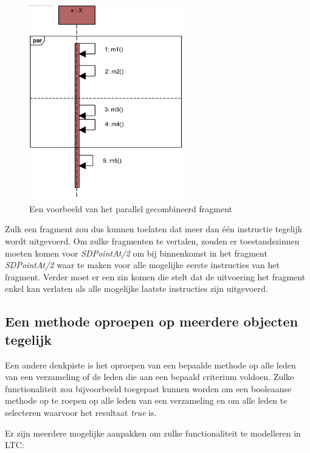 \begin{figure}
	\centering
	\includegraphics[width=0.6\textwidth]{chap-declaratieve-seq/seq-par.png}
	\caption{Een voorbeeld van het parallel gecombineerd fragment}
	\label{fig:seq-par}
\end{figure}

Zulk een fragment zou dus kunnen toelaten dat meer dan \'e\'en instructie tegelijk wordt uitgevoerd. Om zulke fragmenten te vertalen, zouden er toestandszinnen moeten komen voor \textit{SDPointAt/2} om bij binnenkomst in het fragment \textit{SDPointAt/2} waar te maken voor alle mogelijke eerste instructies van het fragment. Verder moet er een zin komen die stelt dat de uitvoering het fragment enkel kan verlaten als alle mogelijke laatste instructies zijn uitgevoerd.

\subsection{Een methode oproepen op meerdere objecten tegelijk}

Een andere denkpiste is het oproepen van een bepaalde methode op alle leden van een verzameling of de leden die aan een bepaald criterium voldoen. Zulke functionaliteit zou bijvoorbeeld toegepast kunnen worden om een booleaanse methode op te roepen op alle leden van een verzameling en om alle leden te selecteren waarvoor het resultaat \textit{true} is.

Er zijn meerdere mogelijke aanpakken om zulke functionaliteit te modelleren in LTC:

